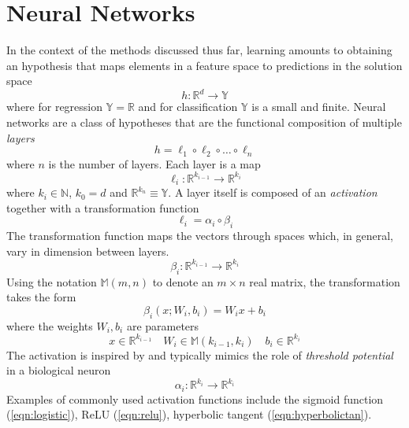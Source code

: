 \documentclass{article}
\theoremstyle{definition}
\theoremstyle{remark}
\begin{document}
\section{Neural Networks}
In the context of the methods discussed thus far, learning amounts to obtaining an hypothesis that maps elements in a feature space to predictions in the solution space
\begin{equation}
  h : \mathbb{R}^{d} \rightarrow \mathbb{Y}
  \label{eqn:hypothesis}
\end{equation}
where for regression $\mathbb{Y} = \mathbb{R}$ and for classification $\mathbb{Y}$ is a small and finite.
Neural networks are a class of hypotheses that are the functional composition of multiple \textit{layers}
\begin{equation}
  h = \ell_{1} \circ \ell_{2} \circ \dots \circ \ell_{n}   
  \label{eqn:composition}
\end{equation}
where $n$ is the number of layers.
Each layer is a map 
\begin{equation}
  \ell_{i} : \mathbb{R}^{k_{i - 1}} \rightarrow \mathbb{R} ^ {k_{i}}
  \label{eqn:layers}
\end{equation}
where $k_{i} \in \mathbb{N}$, $k_{0} = d$ and $\mathbb{R}^{k_{n}} \equiv \mathbb{Y}$.
A layer itself is composed of an \textit{activation} together with a transformation function 
\begin{equation}
  \ell_{i} = \alpha_{i} \circ \beta_{i} 
  \label{eqn:layercomposition}
\end{equation}
The transformation function maps the vectors through spaces which, in general, vary in dimension between layers.
\begin{equation}
  \beta_{i} : \mathbb{R}^{k_{i-1}} \rightarrow \mathbb{R}^{k_{i}}
  \label{eqn:transformation}
\end{equation}
Using the notation $\mathbb{M}(m, n)$ to denote an $m \times n$ real matrix, the transformation takes the form
\begin{equation}
  \beta_{i}(x; W_{i}, b_{i}) = W_{i} x + b_{i}
  \label{eqn:transformfunction}
\end{equation}
where the weights  $W_{i}, b_{i}$ are parameters
\begin{equation}
  x \in \mathbb{R}^{k_{i-1}} \quad W_{i} \in \mathbb{M}(k_{i-1}, k_{i}) \quad b_{i}\in \mathbb{R}^{k_{i}} 
  \label{eqn:weights}
\end{equation}
The activation is inspired by and typically mimics the role of \textit{threshold potential} in a biological neuron 
\begin{equation}
  \alpha_{i} : \mathbb{R}^{k_{i}} \rightarrow \mathbb{R}^{k_{i}}
  \label{eqn:activation}
\end{equation}
Examples of commonly used activation functions include the sigmoid function (\ref{eqn:logistic}), ReLU ({\ref{eqn:relu}}), hyperbolic tangent (\ref{eqn:hyperbolictan}).
\end{document}
